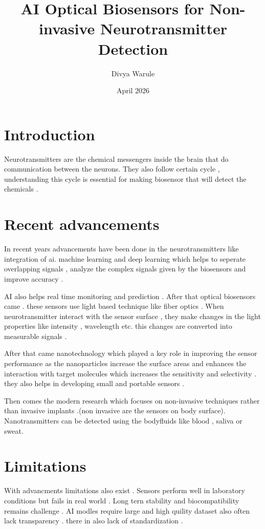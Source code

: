 \documentclass{article}
\title{AI Optical Biosensors for Non-invasive Neurotransmitter Detection }
\author{Divya Warule}
\date{April 2026}
\begin{document}
\maketitle

\section{Introduction}
Neurotransmitters are the chemical messengers inside the brain that do communication between the neurons. 
They also follow certain cycle , understanding this cycle is essential for making biosensor that will detect the chemicals .

\section{Recent advancements}
In recent years advancements have been done in the neurotransmitters like integration of ai. machine learning  and deep learning which helps to seperate overlapping signals , analyze the complex signals given by the biosensors and improve accuracy .

AI also helps real time monitoring and prediction .
After  that optical biosensors came . these sensors use light based technique like fiber optics . When neurotransmitter interact with the sensor surface , they make changes in the light properties like intensity , wavelength etc. this changes are converted into measurable signals .

After that came nanotechnology which played a key role in improving the sensor performance as the nanoparticles increase the surface areas and enhances the interaction with target molecules which increases the sensitivity and selectivity . they also helps in developing small and portable sensors .

Then comes the modern research which focuses on non-invasive techniques rather than invasive implants .(non invasive are the sensors on body surface). 
Nanotransmitters can be detected using the bodyfluids like blood , saliva or sweat.

\section{Limitations}
With advancments limitations also exist . Sensors perform well in laboratory conditions but fails in real world . Long tern stability and biocompatibility remains challenge . AI modles require  large and high quility dataset also often lack transparency . there in also lack of standardization .
\end{document}
